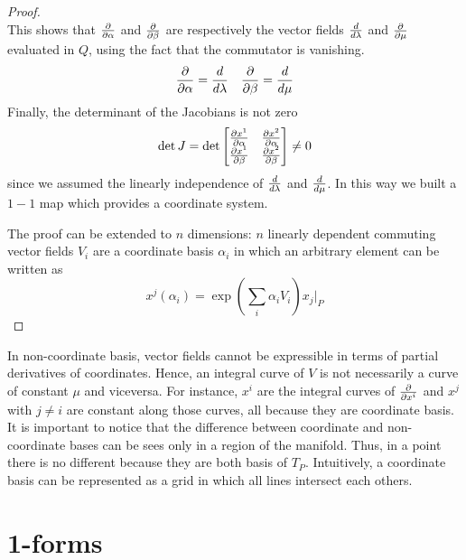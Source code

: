 \begin{proof}
\begin{equation*}
    \end{equation*}
    This shows that $\frac{\partial}{\partial\alpha}$ and $\frac{\partial}{\partial\beta}$ are respectively the vector fields $\frac{d}{d\lambda}$ and $\frac{\partial}{\partial\mu}$ evaluated in $Q$, using the fact that the commutator is vanishing. 
    \begin{equation*}
        \frac{\partial}{\partial\alpha} = \frac{d}{d\lambda} \quad \frac{\partial}{\partial\beta} = \frac{d}{d\mu}
    \end{equation*}
    Finally, the determinant of the Jacobians is not zero
    \begin{equation*}
        \det J = \det \begin{bmatrix}
            \frac{\partial x^1}{\partial\alpha} & \frac{\partial x^2}{\partial\alpha} \\
            \frac{\partial x^1}{\partial\beta} & \frac{\partial x^2}{\partial\beta} \\
        \end{bmatrix} \neq 0
    \end{equation*}
    since we assumed the linearly independence of $\frac{d}{d\lambda}$ and $\frac{d}{d\mu}$. In this way we built a $1-1$ map which provides a coordinate system.

    The proof can be extended to $n$ dimensions: $n$ linearly dependent commuting vector fields $V_i$ are a coordinate basis $\alpha_i$ in which an arbitrary element can be written as 
    \begin{equation*}
        x^j(\alpha_i) = \exp (\sum_i \alpha_i V_i) x_j \vert_P
    \end{equation*}
    \end{proof} 

    In non-coordinate basis, vector fields cannot be expressible in terms of partial derivatives of coordinates. Hence, an integral curve of $V$ is not necessarily a curve of constant $\mu$ and viceversa. For instance, $x^i$ are the integral curves of $\frac{\partial}{\partial x^i}$ and $x^j$ with $j\neq i$ are constant along those curves, all because they are coordinate basis. It is important to notice that the difference between coordinate and non-coordinate bases can be sees only in a region of the manifold. Thus, in a point there is no different because they are both basis of $T_P$. Intuitively, a coordinate basis can be represented as a grid in which all lines intersect each others.

\section{1-forms}

